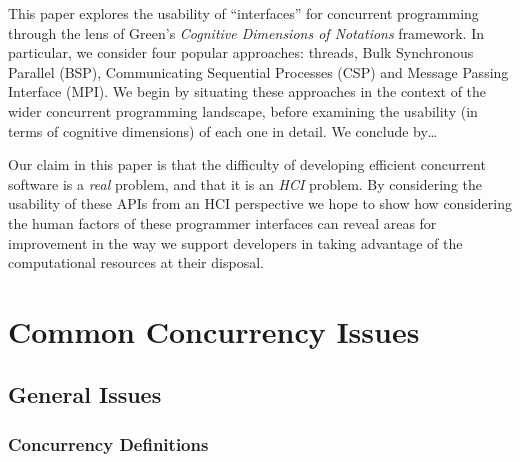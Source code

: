 \documentclass{sig-alternate}
\begin{document}
This paper explores the usability of ``interfaces'' for concurrent
programming through the lens of Green's \emph{Cognitive Dimensions of
  Notations} framework\cite{green89:_cognit_dimen_notat}. In
particular, we consider four popular approaches:
threads, Bulk Synchronous Parallel (BSP), Communicating Sequential
Processes (CSP) and Message Passing Interface (MPI).  We begin by
situating these approaches in the context of the wider concurrent
programming landscape, before examining the usability (in terms of
cognitive dimensions) of each one in detail. We conclude by\ldots

Our claim in this paper is that the difficulty of developing efficient
concurrent software is a \emph{real} problem, and that it is an
\emph{HCI} problem. By considering the usability of these APIs from an
HCI perspective we hope to show how considering the human factors of
these programmer interfaces can reveal areas for improvement in the
way we support developers in taking advantage of the computational
resources at their disposal.







\section{Common Concurrency Issues}
\subsection{General Issues}
\subsubsection{Concurrency Definitions}
\end{document}
